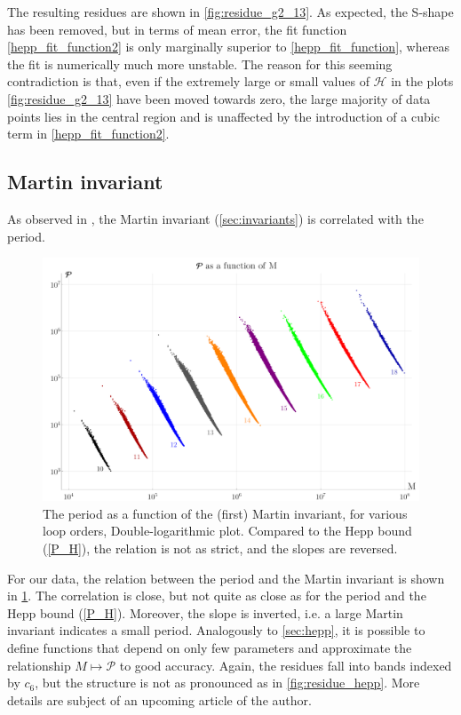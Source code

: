 \documentclass[11pt,a4paper]{article}
\newcommand{\period}{\mathcal P}
\renewcommand{\|}{\rule[-0.4ex]{0.2ex}{1.2em}}
\begin{document}
The resulting residues are shown in \cref{fig:residue_g2_13}. As expected, the S-shape has been removed, but in terms of mean error, the fit function \cref{hepp_fit_function2} is only marginally superior to \cref{hepp_fit_function}, whereas the fit is numerically much more unstable. The reason for this seeming contradiction is that, even if the extremely large or small values of $\mathcal H$ in the plots \cref{fig:residue_g2_13} have been moved towards zero, the large majority of data points lies in the central region and is unaffected by the introduction of a cubic term in \cref{hepp_fit_function2}.



\subsection{Martin invariant}\label{sec:martin}

As observed in \cite{panzer_feynman_2023}, the  Martin invariant (\cref{sec:invariants}) is correlated with the period.

\begin{figure}[h]
	\centering
	\includegraphics[width=.85\linewidth]{P_M}
	\caption{The period as a function of the (first) Martin invariant, for various loop orders, Double-logarithmic plot.  Compared to the Hepp bound  (\cref{P_H}), the relation is not as strict, and the slopes are reversed.  }
	\label{P_M}
\end{figure}

For our data, the relation between the period and the Martin invariant is shown in \cref{P_M}. 
The correlation is close, but not quite as close as for the period and the Hepp bound (\cref{P_H}). Moreover, the slope is inverted, i.e. a large Martin invariant indicates a small period. Analogously to \cref{sec:hepp}, it is possible to define functions that depend on only few parameters and approximate the relationship $M \mapsto \period$ to good accuracy. Again, the residues fall into bands indexed by $c_6$, but the structure is not as pronounced as in \cref{fig:residue_hepp}. More details are subject of an upcoming article of the author. 
\end{document}
